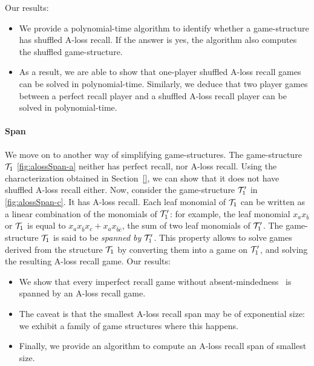 Our results:
\begin{itemize}
\item We provide a polynomial-time algorithm to identify whether a game-structure has shuffled A-loss recall. If the answer is yes, the algorithm also computes the shuffled game-structure.

\item As a result, we are able to show that one-player shuffled A-loss recall games can be solved in polynomial-time. Similarly, we deduce that two player games between a perfect recall player and a shuffled A-loss recall player can be solved in polynomial-time.
\end{itemize}








\paragraph*{Span}
We move on to another way of simplifying game-structures. The game-structure $\mathcal{T}_1$ \cref{fig:alossSpan-a} neither has perfect recall, nor A-loss recall. Using the characterization obtained in Section~\ref{}, we can show that it does not have  shuffled A-loss recall either. Now, consider the game-structure $\mathcal{T}'_1$ in \cref{fig:alossSpan-c}. It has A-loss recall. Each leaf monomial of $\mathcal{T}_1$ can be written as a linear combination of the monomials of $\mathcal{T}'_1$: for example, the leaf monomial $x_ax_{\bar{b}}$ or $\mathcal{T}_1$ is equal to $x_a x_{\bar{b}}x_c + x_a x_{\bar{b} \bar{c}}$, the sum of two leaf monomials of $\mathcal{T}'_1$.  The game-structure $\mathcal{T}_1$ is said to be \emph{spanned by} $\mathcal{T}'_1$. This property allows to solve games derived from the structure $\mathcal{T}_1$ by converting them into a game on $\mathcal{T}'_1$, and solving the resulting A-loss recall game. 
Our results:
\begin{itemize}
\item We show that every imperfect recall game without absent-mindedness~\cite{} is spanned by an A-loss recall game.

\item The caveat is that the smallest A-loss recall span may be of exponential size: we exhibit a family of game structures where this happens. 

\item Finally, we provide an algorithm to compute an A-loss recall span of smallest size. 
\end{itemize}

